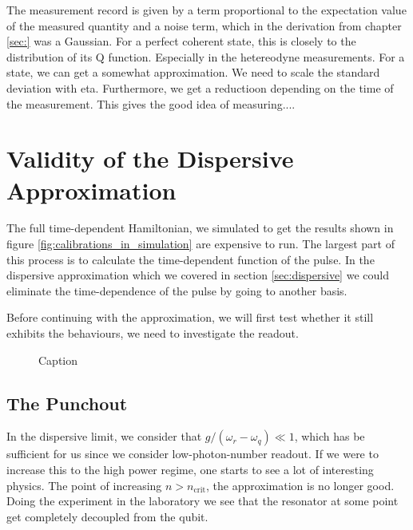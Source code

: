 The measurement record is given by a term proportional to the expectation value of the measured quantity and a noise term, which in the derivation from chapter \ref{sec:} was a Gaussian. For a perfect coherent state, this is closely to the distribution of its Q function. Especially in the hetereodyne measurements. For a state, we can get a somewhat approximation. We need to scale the standard deviation with eta. Furthermore, we get a reductioon depending on the time of the measurement. This gives the good idea of measuring.... 





\section{Validity of the Dispersive Approximation}
The full time-dependent Hamiltonian, we simulated to get the results shown in figure \ref{fig:calibrations_in_simulation} are expensive to run. The largest part of this process is to calculate the time-dependent function of the pulse. In the dispersive approximation which we covered in section \ref{sec:dispersive} we could eliminate the time-dependence of the pulse by going to another basis.

Before continuing with the approximation, we will first test whether it still exhibits the behaviours, we need to investigate the readout. 

\begin{figure}
    \centering
    \caption{Caption}
    \label{fig:enter-label}
\end{figure}

\subsection{The Punchout}
In the dispersive limit, we consider that $g/(\omega_r - \omega_q) \ll 1$, which has be sufficient for us since we consider low-photon-number readout. If we were to increase this to the high power regime, one starts to see a lot of interesting physics. The point of increasing $n > n_{\text{crit}}$, the approximation is no longer good. Doing the experiment in the laboratory we see that the resonator at some point get completely decoupled from the qubit.

